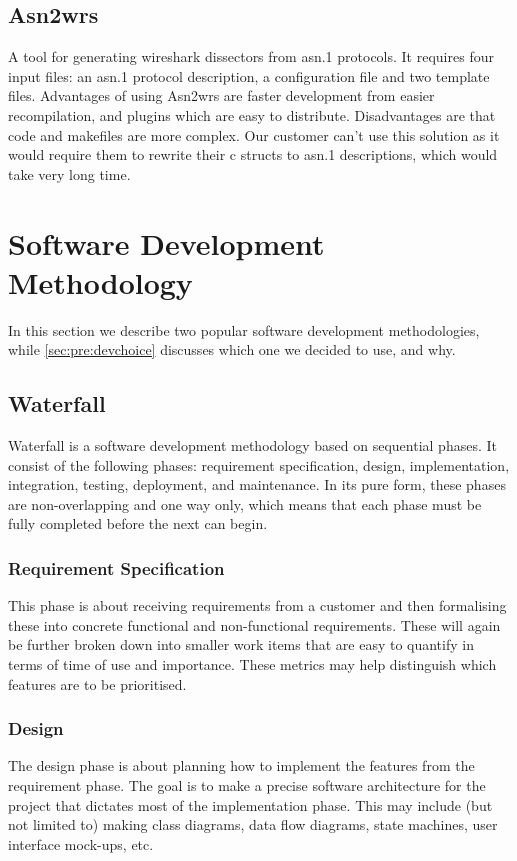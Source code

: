 \subsection{Asn2wrs}
A tool for generating \Gls{wireshark} \glspl{dissector} from \Gls{asn.1} \glspl{protocol}. It requires
four input files: an \Gls{asn.1} \gls{protocol} description, a configuration file and two
template files. Advantages of using Asn2wrs are faster development from
easier recompilation, and plugins which are easy to distribute. Disadvantages
are that code and \glspl{makefile} are more complex. Our customer can't use this
solution as it would require them to rewrite their \Gls{c} \glspl{struct} to \Gls{asn.1}
descriptions, which would take very long time.


\section{Software Development Methodology}
\label{sec:pre:method}
In this section we describe two popular software development methodologies,
while \autoref{sec:pre:devchoice} discusses which one we decided to use, and
why.

\subsection{Waterfall}
\label{sec:pre:waterfall}
Waterfall is a software development methodology based on sequential phases.
It consist of the following phases: requirement specification, design,
implementation, integration, testing, deployment, and maintenance. In its pure
form, these phases are non-overlapping and one way only, which means that each
phase must be fully completed before the next can begin.

\subsubsection{Requirement Specification}
This phase is about receiving requirements from a customer and then formalising
these into concrete functional and non-functional requirements. These will
again be further broken down into smaller work items that are easy to quantify
in terms of time of use and importance. These metrics may help distinguish
which features are to be prioritised.

\subsubsection{Design}
The design phase is about planning how to implement the features from the
requirement phase. The goal is to make a precise software architecture for the
project that dictates most of the implementation phase. This may include (but
not limited to) making class diagrams, data flow diagrams, state machines, user
interface mock-ups, etc.

